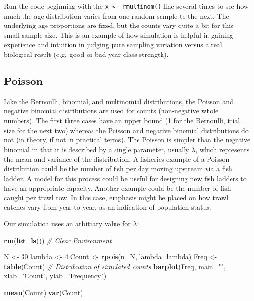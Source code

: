 \documentclass[
]{krantz}
\makeatletter
\newenvironment{Shaded}{\begin{snugshade}}{\end{snugshade}}
\newcommand{\AttributeTok}[1]{\textcolor[rgb]{0.27,0.27,0.27}{#1}}
\newcommand{\CommentTok}[1]{\textcolor[rgb]{0.37,0.37,0.37}{\textit{#1}}}
\newcommand{\DecValTok}[1]{\textcolor[rgb]{0.06,0.06,0.06}{#1}}
\newcommand{\FunctionTok}[1]{\textcolor[rgb]{0.27,0.27,0.27}{\textbf{#1}}}
\newcommand{\NormalTok}[1]{#1}
\newcommand{\OtherTok}[1]{\textcolor[rgb]{0.37,0.37,0.37}{#1}}
\newcommand{\StringTok}[1]{\textcolor[rgb]{0.5,0.5,0.5}{#1}}
\newenvironment{kframe}{%
\medskip{}
\setlength{\fboxsep}{.8em}
 \def\at@end@of@kframe{}%
 \ifinner\ifhmode%
  \def\at@end@of@kframe{\end{minipage}}%
  \begin{minipage}{\columnwidth}%
 \fi\fi%
 \def\FrameCommand##1{\hskip\@totalleftmargin \hskip-\fboxsep
 \colorbox{shadecolor}{##1}\hskip-\fboxsep
     \hskip-\linewidth \hskip-\@totalleftmargin \hskip\columnwidth}%
 \MakeFramed {\advance\hsize-\width
   \@totalleftmargin\z@ \linewidth\hsize
   \@setminipage}}%
 {\par\unskip\endMakeFramed%
 \at@end@of@kframe}
\renewenvironment{Shaded}{\begin{kframe}}{\end{kframe}}
\makeatother
\begin{document}
Run the code beginning with the \texttt{x\ \textless{}-\ rmultinom()} line several times to see how much the age distribution varies from one random sample to the next. The underlying age proportions are fixed, but the counts vary quite a bit for this small sample size. This is an example of how simulation is helpful in gaining experience and intuition in judging pure sampling variation versus a real biological result (e.g.~good or bad year-class strength).

\hypertarget{PoissonDist}{%
\subsection{Poisson}\label{PoissonDist}}

Like the Bernoulli, binomial, and multinomial distributions, the Poisson and negative binomial distributions are used for counts (non-negative whole numbers). The first three cases have an upper bound (1 for the Bernoulli, trial size for the next two) whereas the Poisson and negative binomial distributions do not (in theory, if not in practical terms). The Poisson is simpler than the negative binomial in that it is described by a single parameter, usually \(\lambda\), which represents the mean and variance of the distribution. A fisheries example of a Poisson distribution could be the number of fish per day moving upstream via a fish ladder. A model for this process could be useful for designing new fish ladders to have an appropriate capacity. Another example could be the number of fish caught per trawl tow. In this case, emphasis might be placed on how trawl catches vary from year to year, as an indication of population status.

Our simulation uses an arbitrary value for \(\lambda\):

\begin{Shaded}
\begin{Highlighting}[]
\FunctionTok{rm}\NormalTok{(}\AttributeTok{list=}\FunctionTok{ls}\NormalTok{()) }\CommentTok{\# Clear Environment}

\NormalTok{N }\OtherTok{\textless{}{-}} \DecValTok{30}
\NormalTok{lambda }\OtherTok{\textless{}{-}} \DecValTok{4}
\NormalTok{Count }\OtherTok{\textless{}{-}} \FunctionTok{rpois}\NormalTok{(}\AttributeTok{n=}\NormalTok{N, }\AttributeTok{lambda=}\NormalTok{lambda)}
\NormalTok{Freq }\OtherTok{\textless{}{-}} \FunctionTok{table}\NormalTok{(Count)  }\CommentTok{\# Distribution of simulated counts}
\FunctionTok{barplot}\NormalTok{(Freq, }\AttributeTok{main=}\StringTok{""}\NormalTok{, }\AttributeTok{xlab=}\StringTok{"Count"}\NormalTok{, }\AttributeTok{ylab=}\StringTok{"Frequency"}\NormalTok{)}

\FunctionTok{mean}\NormalTok{(Count)}
\FunctionTok{var}\NormalTok{(Count)}
\end{Highlighting}
\end{Shaded}
\end{document}
